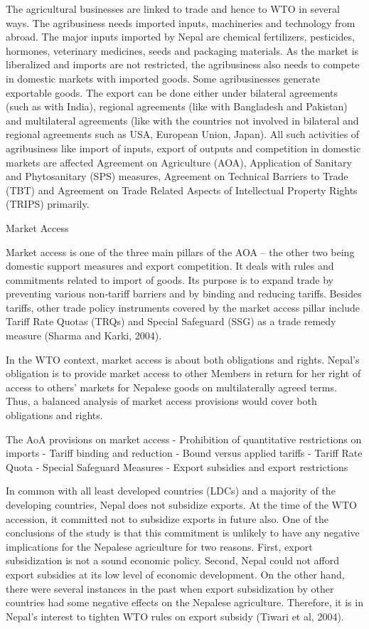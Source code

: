 \documentclass[
  openany]{book}
\begin{document}
The agricultural businesses are linked to trade and hence to WTO in several ways. The agribusiness needs imported inputs, machineries and technology from abroad. The major inputs imported by Nepal are chemical fertilizers, pesticides, hormones, veterinary medicines, seeds and packaging materials. As the market is liberalized and imports are not restricted, the agribusiness also needs to compete in domestic markets with imported goods. Some agribusinesses generate exportable goods. The export can be done either under bilateral agreements (such as with India), regional agreements (like with Bangladesh and Pakistan) and multilateral agreements (like with the countries not involved in bilateral and regional agreements such as USA, European Union, Japan). All such activities of agribusiness like import of inputs, export of outputs and competition in domestic markets are affected Agreement on Agriculture (AOA), Application of Sanitary and Phytosanitary (SPS) measures, Agreement on Technical Barriers to Trade (TBT) and Agreement on Trade Related Aspects of Intellectual Property Rights (TRIPS) primarily.

Market Access

Market access is one of the three main pillars of the AOA -- the other two being domestic support measures and export competition. It deals with rules and commitments related to import of goods. Its purpose is to expand trade by preventing various non-tariff barriers and by binding and reducing tariffs. Besides tariffs, other trade policy instruments covered by the market access pillar include Tariff Rate Quotas (TRQs) and Special Safeguard (SSG) as a trade remedy measure (Sharma and Karki, 2004).

In the WTO context, market access is about both obligations and rights. Nepal's obligation is to provide market access to other Members in return for her right of access to others' markets for Nepalese goods on multilaterally agreed terms. Thus, a balanced analysis of market access provisions would cover both obligations and rights.

The AoA provisions on market access
- Prohibition of quantitative restrictions on imports
- Tariff binding and reduction
- Bound versus applied tariffs
- Tariff Rate Quota
- Special Safeguard Measures
- Export subsidies and export restrictions

In common with all least developed countries (LDCs) and a majority of the developing countries, Nepal does not subsidize exports. At the time of the WTO accession, it committed not to subsidize exports in future also. One of the conclusions of the study is that this commitment is unlikely to have any negative implications for the Nepalese agriculture for two reasons. First, export subsidization is not a sound economic policy. Second, Nepal could not afford export subsidies at its low level of economic development. On the other hand, there were several instances in the past when export subsidization by other countries had some negative effects on the Nepalese agriculture. Therefore, it is in Nepal's interest to tighten WTO rules on export subsidy (Tiwari et al, 2004).
\end{document}
